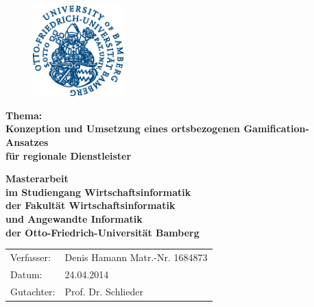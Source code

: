 \begin{titlepage}
\begin{figure}[H]
\begin{center}
\includegraphics[width=35mm]{images/deckblatt_logo.eps}
\end{center}
\end{figure}

{\sffamily
\begin{center}
	\bfseries
	\Large {Thema:\\Konzeption und Umsetzung eines ortsbezogenen Gamification-Ansatzes\\
	für regionale Dienstleister}
\end{center}
\vspace{1cm}
\begin{center}

	{\Large\bfseries Masterarbeit\\}
	{\normalsize\bfseries im Studiengang Wirtschaftsinformatik\\}
	{\normalsize\bfseries der Fakultät Wirtschaftsinformatik\\}
	{\normalsize\bfseries und Angewandte Informatik\\}
	{\normalsize\bfseries der Otto-Friedrich-Universität Bamberg\\}
	\vspace*{2cm}

\end{center}
}
{\sffamily
\vspace*{3cm}
\begin{large}

\begin{tabular}{ll}
		Verfasser: & Denis Hamann \hspace*{2cm} Matr.-Nr. 1684873 \\
		Datum: & 24.04.2014\\
		Gutachter: & Prof. Dr. Schlieder\\


\end{tabular}\\[0.5cm]

\end{large}

}

\end{titlepage}